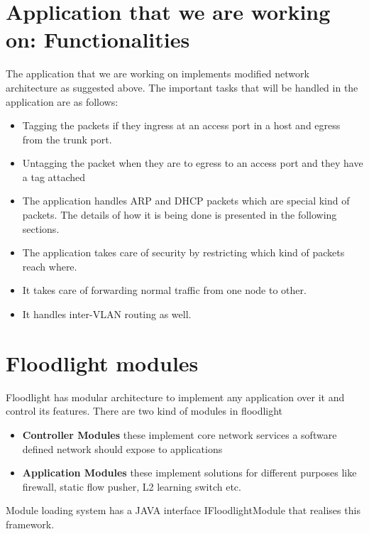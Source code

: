 \section{Application that we are working on: Functionalities}

The application that we are working on implements modified network architecture as suggested above. The important tasks that will be handled in the application are as follows:

\begin{itemize}
    \item Tagging the packets if they ingress at an access port in a host and egress
from the trunk port.
\item Untagging the packet when they are to egress to an access port and they
have a tag attached

\item The application handles ARP and DHCP packets which are special kind
of packets. The details of how it is being done is presented in the following
sections.

\item The application takes care of security by restricting which kind of packets
reach where.

\item It takes care of forwarding normal traffic from one node to other.

\item It handles inter-VLAN routing as well.




\end{itemize}



\section{Floodlight modules}
Floodlight has modular architecture to implement any application over it and control its features. There are two kind of modules in floodlight
\begin{itemize}
    \item \textbf{Controller Modules} these implement core network services a software defined network should expose to applications
    \item \textbf{Application Modules} these implement solutions for different purposes like firewall, static flow pusher, L2 learning switch etc.
\end{itemize}

Module loading system has a JAVA interface IFloodlightModule that realises this framework.
